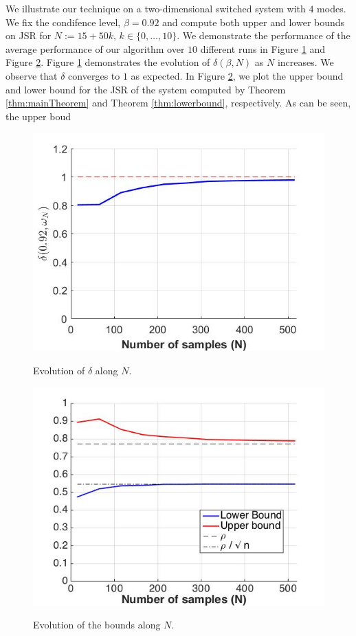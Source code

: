 We illustrate our technique on a two-dimensional switched system with $4$ modes. We fix the condifence level, $\beta = 0.92$ and compute both upper and lower bounds on JSR for $N:=15+50k,\, k \in\{0, \ldots, 10\}.$ We demonstrate the performance of the average performance of our algorithm over $10$ different runs in Figure \ref{fig:1} and Figure \ref{fig:2}. Figure \ref{fig:1} demonstrates the evolution of $\delta(\beta, N)$ as $N$ increases. We observe that $\delta$ converges to $1$ as expected. In Figure \ref{fig:2}, we plot the upper bound and lower bound for the JSR of the system computed by Theorem \ref{thm:mainTheorem} and Theorem \ref{thm:lowerbound}, respectively. As can be seen, the upper boud

\begin{figure}
\begin{center}
\includegraphics[scale=0.35]{delta1.jpg}
\label{fig:1}
\caption{Evolution of $\delta$ along $N$.}
\end{center}
\end{figure}


\begin{figure}
\begin{center}
\includegraphics[scale=0.35]{bounds1.jpg}
\label{fig:2}
\caption{Evolution of the bounds along $N$.}
\end{center}
\end{figure}


